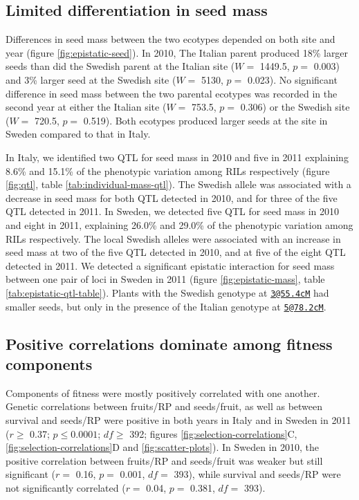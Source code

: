 \documentclass[]{article}
\begin{document}
\hypertarget{limited-differentiation-in-seed-mass}{%
\subsection{Limited differentiation in seed mass}\label{limited-differentiation-in-seed-mass}}

Differences in seed mass between the two ecotypes depended on both site and year (figure \ref{fig:epistatic-seed}). In 2010, The Italian parent produced 18\% larger seeds than did the Swedish parent at the Italian site
(\(W=\) 1449.5,
\(p=\) 0.003)
and 3\% larger seed at the Swedish site
(\(W =\) 5130,
\(p=\) 0.023).
No significant difference in seed mass between the two parental ecotypes was recorded in the second year at either the Italian site
(\(W =\) 753.5,
\(p=\) 0.306)
or the Swedish site
(\(W=\) 720.5,
\(p=\) 0.519).
Both ecotypes produced larger seeds at the site in Sweden compared to that in Italy.

In Italy, we identified two QTL for seed mass in 2010 and five in 2011 explaining 8.6\% and 15.1\% of the phenotypic variation among RILs respectively (figure \ref{fig:qtl}, table \ref{tab:individual-mass-qtl}). The Swedish allele was associated with a decrease in seed mass for both QTL detected in 2010, and for three of the five QTL detected in 2011. In Sweden, we detected five QTL for seed mass in 2010 and eight in 2011, explaining 26.0\% and 29.0\% of the phenotypic variation among RILs respectively. The local Swedish alleles were associated with an increase in seed mass at two of the five QTL detected in 2010, and at five of the eight QTL detected in 2011. We detected a significant epistatic interaction for seed mass between one pair of loci in Sweden in 2011 (figure \ref{fig:epistatic-mass}, table \ref{tab:epistatic-qtl-table}). Plants with the Swedish genotype at \href{mailto:3@55.4cM}{\nolinkurl{3@55.4cM}} had smaller seeds, but only in the presence of the Italian genotype at \href{mailto:5@78.2cM}{\nolinkurl{5@78.2cM}}.

\hypertarget{positive-correlations-dominate-among-fitness-components}{%
\subsection{Positive correlations dominate among fitness components}\label{positive-correlations-dominate-among-fitness-components}}

Components of fitness were mostly positively correlated with one another. Genetic correlations between fruits/RP and seeds/fruit, as well as between survival and seeds/RP were positive in both years in Italy and in Sweden in 2011
(\(r \geq\)
0.37;
\(p \leq 0.0001\);
\(df \geq\)
392;
figures \ref{fig:selection-correlations}C, \ref{fig:selection-correlations}D and \ref{fig:scatter-plots}).
In Sweden in 2010, the positive correlation between fruits/RP and seeds/fruit was weaker but still significant
(\(r=\) 0.16,
\(p=\) 0.001,
\(df=\) 393),
while survival and seeds/RP were not significantly correlated
(\(r=\) 0.04,
\(p=\) 0.381,
\(df=\) 393).
\end{document}
